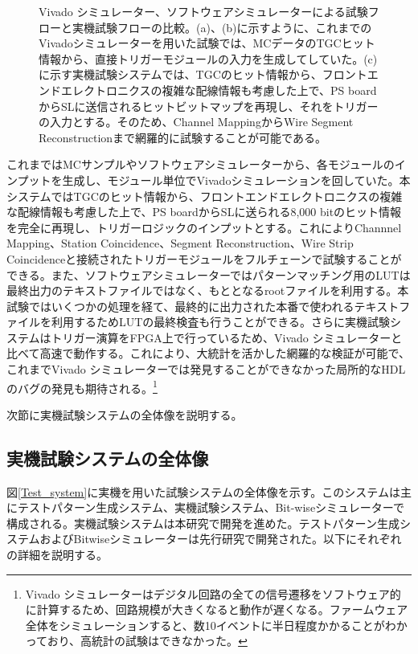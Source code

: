 \begin{figure}
    \caption[試験フロー]{Vivado シミュレーター、ソフトウェアシミュレーターによる試験フローと実機試験フローの比較。(a)、(b)に示すように、これまでのVivadoシミュレーターを用いた試験では、MCデータのTGCヒット情報から、直接トリガーモジュールの入力を生成してしていた。(c)に示す実機試験システムでは、TGCのヒット情報から、フロントエンドエレクトロニクスの複雑な配線情報も考慮した上で、PS boardからSLに送信されるヒットビットマップを再現し、それをトリガーの入力とする。そのため、Channel MappingからWire Segment Reconstructionまで網羅的に試験することが可能である。}
    \label{Test_Flow}
\end{figure}

これまではMCサンプルやソフトウェアシミュレーターから、各モジュールのインプットを生成し、モジュール単位でVivadoシミュレーションを回していた。本システムではTGCのヒット情報から、フロントエンドエレクトロニクスの複雑な配線情報も考慮した上で、PS boardからSLに送られる8,000 bitのヒット情報を完全に再現し、トリガーロジックのインプットとする。これによりChannnel Mapping、Station Coincidence、Segment Reconstruction、Wire Strip Coincidenceと接続されたトリガーモジュールをフルチェーンで試験することができる。また、ソフトウェアシミュレーターではパターンマッチング用のLUTは最終出力のテキストファイルではなく、もととなるrootファイルを利用する。本試験ではいくつかの処理を経て、最終的に出力された本番で使われるテキストファイルを利用するためLUTの最終検査も行うことができる。さらに実機試験システムはトリガー演算をFPGA上で行っているため、Vivado シミュレーターと比べて高速で動作する。これにより、大統計を活かした網羅的な検証が可能で、これまでVivado シミュレーターでは発見することができなかった局所的なHDLのバグの発見も期待される。\footnote{Vivado シミュレーターはデジタル回路の全ての信号遷移をソフトウェア的に計算するため、回路規模が大きくなると動作が遅くなる。ファームウェア全体をシミュレーションすると、数10イベントに半日程度かかることがわかっており、高統計の試験はできなかった。}

次節に実機試験システムの全体像を説明する。

\subsection{実機試験システムの全体像}
\label{subsec_TestSystemOverview}
図\ref{Test_system}に実機を用いた試験システムの全体像を示す。このシステムは主にテストパターン生成システム、実機試験システム、Bit-wiseシミュレーターで構成される。実機試験システムは本研究で開発を進めた。テストパターン生成システムおよびBitwiseシミュレーターは先行研究で開発された。以下にそれぞれの詳細を説明する。

